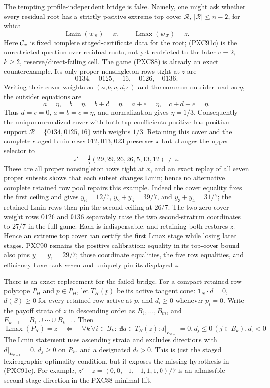 \documentclass[11pt]{article}
\newcommand{\Lmin}{\operatorname{Lmin}}
\newcommand{\Lmax}{\operatorname{Lmax}}
\newcommand{\one}{\mathbf 1}
\begin{document}
The tempting profile-independent bridge is false.  Namely, one might ask
whether every residual root has a strictly positive extreme top cover
$\mathcal R$, $|\mathcal R|\le n-2$, for which
\[
       \Lmin(w_{\mathcal R})=x,
       \qquad \Lmax(w_{\mathcal R})=z.             \tag{PXC91c}
\]
Here ${\cal C}_x$ is fixed complete staged-certificate data for the root;
(PXC91c) is the unrestricted question over residual roots, not yet restricted
to the later $s=2$, $k\ge2$, reserve/direct-failing cell.
The game (PXC88) is already an exact counterexample.  Its only proper
nonsingleton rows tight at $z$ are
\[
 0134,\quad0125,\quad16,\quad0126,\quad0136.
\]
Writing their cover weights as $(a,b,c,d,e)$ and the common outsider load as
$\eta$, the outsider equations are
\[
 a=\eta,\quad b=\eta,\quad b+d=\eta,\quad
 a+e=\eta,\quad c+d+e=\eta.
\]
Thus $d=e=0$, $a=b=c=\eta$, and normalization gives
$\eta=1/3$.  Consequently the unique normalized cover with both top
coefficients positive has positive support
$\mathcal R=\{0134,0125,16\}$ with weights $1/3$.  Retaining this cover and
the complete staged Lmin rows $012,013,023$ preserves $x$ but changes the
upper selector to
\[
 z'=\tfrac17(29,29,26,26,5,13,12)\ne z.            \tag{PXC92a}
\]
These are all proper nonsingleton rows tight at $x$, and an exact replay of
all seven proper subsets shows that each subset changes Lmin; hence no
alternative complete retained row pool repairs this example.
Indeed the cover equality fixes the first ceiling and gives
$y_6=12/7$, $y_2+y_5=39/7$, and $y_3+y_4=31/7$; the retained Lmin rows then
pin the second ceiling at $26/7$.  The two zero-cover-weight rows $0126$ and
$0136$ separately raise the two second-stratum coordinates to $27/7$ in the
full game.  Each is indispensable, and retaining both restores $z$.  Hence
an extreme top cover can certify the first Lmax stage while losing later
stages.  PXC90 remains the positive calibration: equality in its top-cover
bound also pins $y_0=y_1=29/7$; those coordinate equalities, the five row
equalities, and efficiency have rank seven and uniquely pin its displayed
$z$.

There is an exact replacement for the failed bridge.  For a compact
retained-row polytope $P_H$ and $p\in P_H$, let $T_H(p)$ be its active tangent cone:
$\one_N\mathbin\cdot d=0$, $d(S)\ge0$ for every retained row active at $p$,
and $d_i\ge0$ whenever $p_i=0$.  Write the payoff strata of $z$ in descending
order as $B_1,\ldots,B_m$, and $E_{k-1}=B_1\cup\cdots\cup B_{k-1}$.  Then
\[
 \Lmax(P_H)=z\quad\Longleftrightarrow\quad
 \forall k\ \forall i\in B_k:\ \nexists d\in T_H(z):
 d|_{E_{k-1}}=0, d_j\le0\ (j\in B_k), d_i<0       \tag{PXC92b}
\]
The Lmin statement uses ascending strata and excludes directions with
$d|_{E_{k-1}}=0$, $d_j\ge0$ on $B_k$, and a designated $d_i>0$.
This is just the staged
lexicographic optimality condition, but it exposes the missing hypothesis in
(PXC91c).  For example, $z'-z=(0,0,-1,-1,1,1,0)/7$ is an admissible
second-stage direction in the PXC88 minimal lift.
\end{document}
